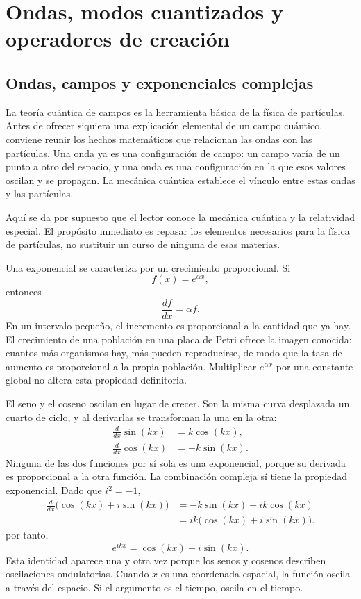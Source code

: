 \chapter{Ondas, modos cuantizados y operadores de creación}

\section{Ondas, campos y exponenciales complejas}

La teoría cuántica de campos es la herramienta básica de la física de partículas. Antes de ofrecer siquiera una explicación elemental de un campo cuántico, conviene reunir los hechos matemáticos que relacionan las ondas con las partículas. Una onda ya es una configuración de campo: un campo varía de un punto a otro del espacio, y una onda es una configuración en la que esos valores oscilan y se propagan. La mecánica cuántica establece el vínculo entre estas ondas y las partículas.

Aquí se da por supuesto que el lector conoce la mecánica cuántica y la relatividad especial. El propósito inmediato es repasar los elementos necesarios para la física de partículas, no sustituir un curso de ninguna de esas materias.

Una exponencial se caracteriza por un crecimiento proporcional. Si
\begin{equation}
f(x)=e^{\alpha x},
\end{equation}
entonces
\begin{equation}
\frac{df}{dx}=\alpha f.
\end{equation}
En un intervalo pequeño, el incremento es proporcional a la cantidad que ya hay. El crecimiento de una población en una placa de Petri ofrece la imagen conocida: cuantos más organismos hay, más pueden reproducirse, de modo que la tasa de aumento es proporcional a la propia población. Multiplicar \(e^{\alpha x}\) por una constante global no altera esta propiedad definitoria.

El seno y el coseno oscilan en lugar de crecer. Son la misma curva desplazada un cuarto de ciclo, y al derivarlas se transforman la una en la otra:
\begin{align}
\frac{d}{dx}\sin(kx)&=k\cos(kx),\\
\frac{d}{dx}\cos(kx)&=-k\sin(kx).
\end{align}
Ninguna de las dos funciones por sí sola es una exponencial, porque su derivada es proporcional a la otra función. La combinación compleja sí tiene la propiedad exponencial. Dado que \(i^2=-1\),
\begin{align}
\frac{d}{dx}\bigl(\cos(kx)+i\sin(kx)\bigr)
&=-k\sin(kx)+ik\cos(kx)\\
&=ik\bigl(\cos(kx)+i\sin(kx)\bigr).
\end{align}
por tanto,
\begin{equation}
e^{ikx}=\cos(kx)+i\sin(kx).
\end{equation}
Esta identidad aparece una y otra vez porque los senos y cosenos describen oscilaciones ondulatorias. Cuando \(x\) es una coordenada espacial, la función oscila a través del espacio. Si el argumento es el tiempo, oscila en el tiempo.

